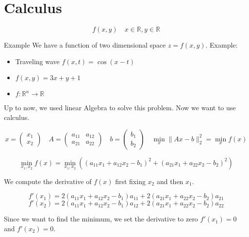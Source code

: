 \chapter{Calculus}
$$ f(x,y) \quad x \in \mathbb{R}, y \in \mathbb{R} $$


Example
We have a function of two dimensional space $z = f(x,y)$.
Example:

\begin{itemize}
    \item Traveling wave $f(x,t) = \cos(x-t)$
    \item $f(x, y) = 3x + y + 1$
    \item $f: \mathbb{R}^n \rightarrow \mathbb{R} $
\end{itemize}

Up to now, we used linear Algebra to solve this problem.
Now we want to use calculus.

$$
x = \begin{pmatrix}
x_1 \\
x_2
\end{pmatrix} \quad A =
\begin{pmatrix}
    a_{11} & a_{12} \\
    a_{21} & a_{22}
\end{pmatrix} \quad b = \begin{pmatrix}
    b_1 \\
    b_2
    \end{pmatrix} \quad \min_{x} \|Ax-b\|^2_2 = \min_x f(x)
$$

$$
\min_{x_1, x_2} f(x) = \min_{x_1, x_2} \left( (a_{11}x_1 + a_{12}x_2 - b_1)^2 + (a_{21}x_1 + a_{22}x_2 - b_2)^2 \right)
$$

We compute the derivative of $f(x)$ first fixing $x_2$ and then $x_1$.

$$ f'(x_1) = 2(a_{11}x_1 + a_{12}x_2 - b_1)a_{11} + 2(a_{21}x_1 + a_{22}x_2 - b_2)a_{21} $$ 
$$ f'(x_2) = 2(a_{11}x_1 + a_{12}x_2 - b_1)a_{12} + 2(a_{21}x_1 + a_{22}x_2 - b_2)a_{22} $$

Since we want to find the minimum, we set the derivative to zero $f'(x_1) = 0$ and $f'(x_2) = 0$.

